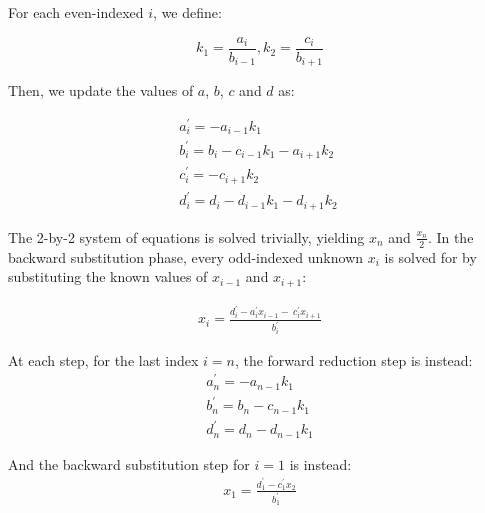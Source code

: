 \documentclass{elsarticle}
\begin{document}
For each even-indexed $i$, we define:

\begin{equation*}
k_1 = \frac{a_i}{b_{i-1}},
k_2 = \frac{c_i}{b_{i+1}}
\end{equation*}

Then, we update the values of $a$, $b$, $c$ and $d$ as:

\begin{align}
& a^{\prime}_i = -a_{i-1}k_1 \
    \label{eqn:forward-reduction-1}& \\
& b^{\prime}_i = b_i - c_{i-1}k_1 - a_{i+1}k_2 \
    \label{eqn:forward-reduction-2}& \\
& c^{\prime}_i = -c_{i+1}k_2 \
    \label{eqn:forward-reduction-3}& \\
& d^{\prime}_i = d_i - d_{i-1}k_1  - d_{i+1}k_2 \
    \label{eqn:forward-reduction-4}&
\end{align}

The 2-by-2 system of equations is solved trivially,
yielding $x_n$ and $\frac{x_n}{2}$.
In the backward substitution phase,
every odd-indexed unknown $x_i$ is solved for by
substituting the known values of $x_{i-1}$ and $x_{i+1}$:

\begin{align} \label{eqn:back-substitution}
x_i = \frac{d^{\prime}_i - a^{\prime}_ix_{i-1} - \
    c^{\prime}_ix_{i+1}}{b^{\prime}_i}
\end{align}

At each step, for the last index $i=n$,
the forward reduction step is instead:
\begin{align} \label{eqn:forward-reduction-last}
    & a^{\prime}_n = -a_{n-1}k_1 & \\
    & b^{\prime}_n = b_n - c_{n-1}k_1 & \\
    & d^{\prime}_n = d_n - d_{n-1}k_1&
\end{align}

And the backward substitution step for $i=1$ is instead:
\begin{align} \label{eqn:back-substitution-first}
x_1 = \frac{d^{\prime}_1 - c^{\prime}_1x_{2}}{b^{\prime}_1}
\end{align}
\end{document}

